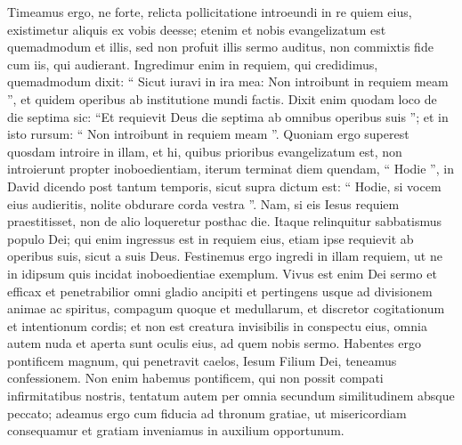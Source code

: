 \begin{biblechapter}
\begin{biblechapter}
\begin{biblechapter}
\begin{biblechapter}
\verse Timeamus ergo, ne forte, relicta pollicitatione introeundi in re quiem eius, existimetur aliquis ex vobis deesse; 
\verse etenim et nobis evangelizatum est quemadmodum et illis, sed non profuit illis sermo auditus, non commixtis fide cum iis, qui audierant. 
\verse Ingredimur enim in requiem, qui credidimus, quemadmodum dixit:
 “ Sicut iuravi in ira mea:
 Non introibunt in requiem meam ”,
 et quidem operibus ab institutione mundi factis. 
\verse Dixit enim quodam loco de die septima sic: “Et requievit Deus die septima ab omnibus operibus suis ”; 
\verse et in isto rursum: “ Non introibunt in requiem meam ”. 
\verse Quoniam ergo superest quosdam introire in illam, et hi, quibus prioribus evangelizatum est, non introierunt propter inoboedientiam, 
\verse iterum terminat diem quendam, “ Hodie ”, in David dicendo post tantum temporis, sicut supra dictum est:
 “ Hodie, si vocem eius audieritis,
 nolite obdurare corda vestra ”.
 \verse Nam, si eis Iesus requiem praestitisset, non de alio loqueretur posthac die. 
\verse Itaque relinquitur sabbatismus populo Dei; 
\verse qui enim ingressus est in requiem eius, etiam ipse requievit ab operibus suis, sicut a suis Deus.
 \verse Festinemus ergo ingredi in illam requiem, ut ne in idipsum quis incidat inoboedientiae exemplum. 
\verse Vivus est enim Dei sermo et efficax et penetrabilior omni gladio ancipiti et pertingens usque ad divisionem animae ac spiritus, compagum quoque et medullarum, et discretor cogitationum et intentionum cordis; 
\verse et non est creatura invisibilis in conspectu eius, omnia autem nuda et aperta sunt oculis eius, ad quem nobis sermo.
 \verse Habentes ergo pontificem magnum, qui penetravit caelos, Iesum Filium Dei, teneamus confessionem. 
\verse Non enim habemus pontificem, qui non possit compati infirmitatibus nostris, tentatum autem per omnia secundum similitudinem absque peccato; 
\verse adeamus ergo cum fiducia ad thronum gratiae, ut misericordiam consequamur et gratiam inveniamus in auxilium opportunum.
 

\end{biblechapter}
\end{biblechapter}
\end{biblechapter}
\end{biblechapter}
